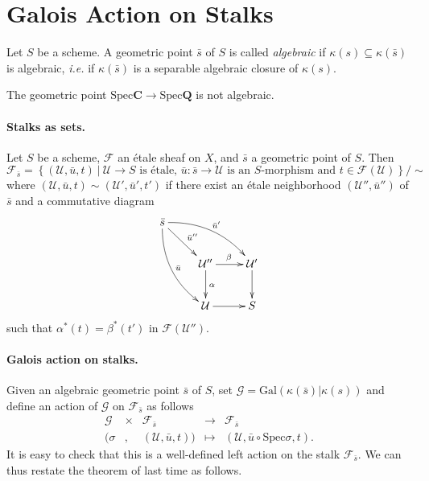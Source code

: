 \section{Galois Action on Stalks}
\label{section:GaloisActionOnStalks}

\begin{definition}
Let $S$ be a scheme. A geometric point $\bar s$ of $S$ is called 
{\it algebraic} if $\kappa(s) \subseteq \kappa(\bar s)$ is algebraic, {\it 
i.e.} if $\kappa(\bar s)$ is a separable algebraic closure of $\kappa(s)$.
\end{definition}

\begin{example}
The geometric point $\text{Spec} \mathbf{C} \to \text{Spec} \mathbf{Q}$ is not 
algebraic.
\end{example}

\paragraph{Stalks as sets.}
Let $S$ be a scheme, $\mathcal{F}$ an \'etale sheaf on $X$, and $\bar s$ a 
geometric point of $S$. Then 
$$
\mathcal{F}_{\bar s} = \left\{
(\mathcal{U},\bar u, t) \ \big| \ \mathcal{U} \to S \text{ is \'etale, } \bar u 
: \bar s \to \mathcal{U} \text{ is an $S$-morphism and } t \in 
\mathcal{F}(\mathcal{U})
\right\}
\big/\sim
$$
where $(\mathcal{U},\bar u, t) \sim (\mathcal{U}',\bar u', t')$ if there exist 
an \'etale neighborhood $(\mathcal{U}'',\bar u'')$ of $\bar s$ and a 
commutative diagram
$$
\xymatrix{
\bar s \ar^{\bar u''}[rd] \ar^{\bar u'}@/^1pc/[rrd] \ar^{\bar u}@/_1pc/[rdd] \\
& \mathcal{U}'' \ar^{\beta}[r] \ar^{\alpha}[d] & \mathcal{U}' \ar[d] \\
& \mathcal{U} \ar[r] & S
}
$$
such that $\alpha^*(t) = \beta^*(t')$ in $\mathcal{F}(\mathcal{U}'')$.

\paragraph{Galois action on stalks.}
Given an algebraic geometric point $\bar s$ of $S$, set $\mathcal{G} = 
\text{Gal}(\kappa(\bar s) | \kappa(s))$ and define an action of $\mathcal{G}$ 
on $\mathcal{F}_{\bar s}$ as follows
$$
\begin{matrix}
\mathcal{G} & \times & \mathcal{F}_{\bar s} & \longrightarrow & 
\mathcal{F}_{\bar s} \\
(\sigma & , & (\mathcal{U},\bar u, t)) & \longmapsto & (\mathcal{U},\bar u 
\circ \text{Spec} \sigma, t).
\end{matrix}
$$
It is easy to check that this is a well-defined left action on the stalk 
$\mathcal{F}_{\bar s}$. We can thus restate the theorem of last time as follows.


